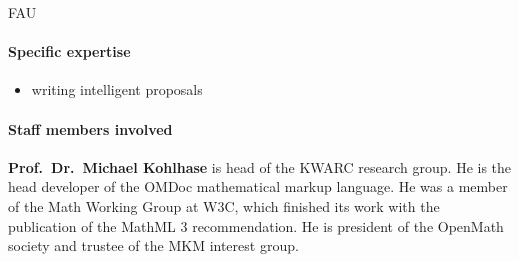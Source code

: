 \begin{sitedescription}{FAU}
\paragraph{Specific expertise}

\begin{itemize}
\item writing intelligent proposals
\end{itemize}

\paragraph{Staff members involved}

\textbf{Prof.\ Dr.\ Michael Kohlhase} is head of the KWARC research
group.  He is the head developer of the OMDoc mathematical markup
language.  He was a member of the Math Working Group at W3C, which finished its work with the publication of the MathML 3 recommendation.  He is president of the OpenMath society and trustee of the MKM
interest group.

\end{sitedescription}


